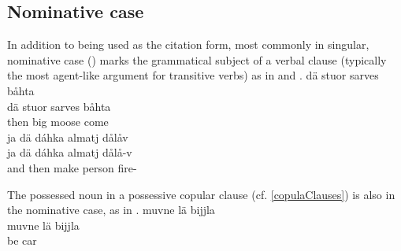 \subsection{Nominative case}\label{nominative}
In addition to being used as the citation form, most commonly in singular, nominative case (\NOMs) marks the grammatical subject of a verbal clause (typically the most agent-like argument for transitive verbs) 
as in  and %
. %
\ea\label{nom1}
\glll dä stuor {sarves} båhta\\ %
	dä stuor sarves båhta\\
	then big moose\BS{} come\BS{}\\\nopagebreak
{} 
\z
\ea\label{nom2}
\glll	ja dä dáhka {almatj} dålåv\\ %
	ja dä dáhka almatj dålå-v\\
	and then make\BS{} person\BS{} fire-\\\nopagebreak
{} 
\z

The possessed noun in a possessive copular clause (cf. \SEC\ref{copulaClauses}) is also in the nominative case, as in .
\ea\label{nom3}
\glll muvne lä {bijjla}\\ %
	muvne lä bijjla\\
	 be\BS{} car\BS{}\\\nopagebreak
{} 
\z


